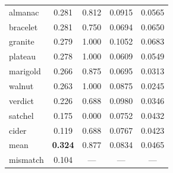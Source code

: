 \begin{table}[t]
\begin{tabular}{@{}lcccc@{}}
almanac     & 0.281 & 0.812 & 0.0915 & 0.0565 \\
bracelet    & 0.281 & 0.750 & 0.0694 & 0.0650 \\
granite     & 0.279 & 1.000 & 0.1052 & 0.0683 \\
plateau     & 0.278 & 1.000 & 0.0609 & 0.0549 \\
marigold    & 0.266 & 0.875 & 0.0695 & 0.0313 \\
walnut      & 0.263 & 1.000 & 0.0875 & 0.0245 \\
verdict     & 0.226 & 0.688 & 0.0980 & 0.0346 \\
satchel     & 0.175 & 0.000 & 0.0752 & 0.0432 \\
cider       & 0.119 & 0.688 & 0.0767 & 0.0423 \\
\midrule
mean & \textbf{0.324} & 0.877 & 0.0834 & 0.0465 \\
mismatch & 0.104 & --- & --- & --- \\
\bottomrule
\end{tabular}
\end{table}
